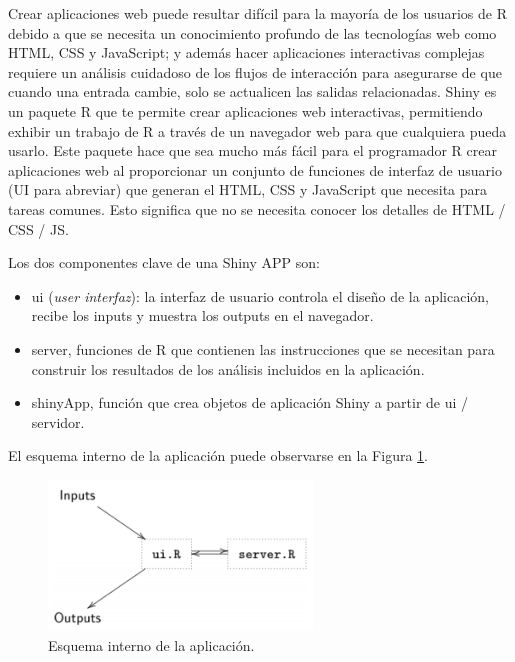 Crear aplicaciones web puede resultar difícil para la mayoría de los usuarios de R debido a que se necesita un conocimiento profundo de las tecnologías web como HTML, CSS y JavaScript; y además hacer aplicaciones interactivas complejas requiere un análisis cuidadoso de los flujos de interacción para asegurarse de que cuando una entrada cambie, solo se actualicen las salidas relacionadas. Shiny es un paquete R que te permite crear aplicaciones web interactivas, permitiendo exhibir un trabajo de R a través de un navegador web para que cualquiera pueda usarlo. Este paquete hace que sea mucho más fácil para el programador R crear aplicaciones web al proporcionar un conjunto de funciones de interfaz de usuario (UI para abreviar) que generan el HTML, CSS y JavaScript que necesita para tareas comunes. Esto significa que no se necesita conocer los detalles de HTML / CSS / JS. 

Los dos componentes clave de una Shiny APP son: 

\begin{itemize}
\item ui (\emph{user interfaz}): la interfaz de usuario controla el diseño de la aplicación, recibe los inputs y
muestra los outputs en el navegador.
\item server, funciones de R que contienen las instrucciones que se necesitan para construir los resultados de los análisis incluidos en la aplicación.
\item shinyApp, función que crea objetos de aplicación Shiny a partir de ui / servidor.
\end{itemize}

El esquema interno de la aplicación puede observarse en la Figura \ref{fig:fig321}. 

\begin{figure}[h]
\begin{center}
\includegraphics[width=7cm]{./Graficos/figura7}
\end{center}
\caption{Esquema interno de la aplicación.}
\label{fig:fig321}
\end{figure}



